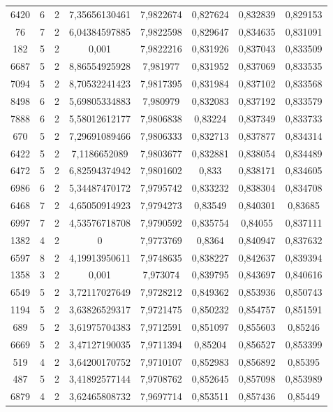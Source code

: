 \begin{longtable}{|c|c|c|c|c|c|c|c|}
6420 & 6 & 2 & 7,35656130461 & 7,9822674 & 0,827624 & 0,832839 & 0,829153 \\
76 & 7 & 2 & 6,04384597885 & 7,9822598 & 0,829647 & 0,834635 & 0,831091 \\
182 & 5 & 2 & 0,001 & 7,9822216 & 0,831926 & 0,837043 & 0,833509 \\
6687 & 5 & 2 & 8,86554925928 & 7,981977 & 0,831952 & 0,837069 & 0,833535 \\
7094 & 5 & 2 & 8,70532241423 & 7,9817395 & 0,831984 & 0,837102 & 0,833568 \\
8498 & 6 & 2 & 5,69805334883 & 7,980979 & 0,832083 & 0,837192 & 0,833579 \\
7888 & 6 & 2 & 5,58012612177 & 7,9806838 & 0,83224 & 0,837349 & 0,833733 \\
670 & 5 & 2 & 7,29691089466 & 7,9806333 & 0,832713 & 0,837877 & 0,834314 \\
6422 & 5 & 2 & 7,1186652089 & 7,9803677 & 0,832881 & 0,838054 & 0,834489 \\
6472 & 5 & 2 & 6,82594374942 & 7,9801602 & 0,833 & 0,838171 & 0,834605 \\
6986 & 6 & 2 & 5,34487470172 & 7,9795742 & 0,833232 & 0,838304 & 0,834708 \\
6468 & 7 & 2 & 4,65050914923 & 7,9794273 & 0,83549 & 0,840301 & 0,83685 \\
6997 & 7 & 2 & 4,53576718708 & 7,9790592 & 0,835754 & 0,84055 & 0,837111 \\
1382 & 4 & 2 & 0 & 7,9773769 & 0,8364 & 0,840947 & 0,837632 \\
6597 & 8 & 2 & 4,19913950611 & 7,9748635 & 0,838227 & 0,842637 & 0,839394 \\
1358 & 3 & 2 & 0,001 & 7,973074 & 0,839795 & 0,843697 & 0,840616 \\
6549 & 5 & 2 & 3,72117027649 & 7,9728212 & 0,849362 & 0,853936 & 0,850743 \\
1194 & 5 & 2 & 3,63826529317 & 7,9721475 & 0,850232 & 0,854757 & 0,851591 \\
689 & 5 & 2 & 3,61975704383 & 7,9712591 & 0,851097 & 0,855603 & 0,85246 \\
6669 & 5 & 2 & 3,47127190035 & 7,9711394 & 0,85204 & 0,856527 & 0,853399 \\
519 & 4 & 2 & 3,64200170752 & 7,9710107 & 0,852983 & 0,856892 & 0,85395 \\
487 & 5 & 2 & 3,41892577144 & 7,9708762 & 0,852645 & 0,857098 & 0,853989 \\
6879 & 4 & 2 & 3,62465808732 & 7,9697714 & 0,853511 & 0,857436 & 0,85449 \\

\end{longtable}
